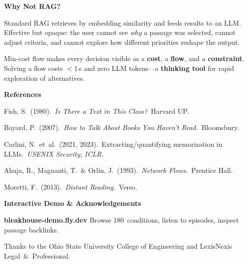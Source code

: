 \documentclass[landscape]{article}
\newcommand{\sectionheadsize}{\fontsize{30}{36}\selectfont}
\newcommand{\subsectionheadsize}{\fontsize{23}{28}\selectfont}
\newcommand{\bodysize}{\fontsize{20}{26}\selectfont}
\newcommand{\smallbody}{\fontsize{18}{23}\selectfont}
\newcommand{\postersection}[1]{%
  \vspace{2pt}%
  {\sffamily\bfseries\sectionheadsize\color{burgundy}#1}\par\nobreak
  \vspace{-4pt}{\color{gold}\rule{1.8in}{2.5pt}}\par
  \vspace{2pt}%
}
\newcommand{\postersubsection}[1]{%
  \vspace{4pt}%
  {\sffamily\bfseries\subsectionheadsize\color{burgundy}#1}\par
  \vspace{2pt}%
}
\begin{document}
\begin{minipage}[t]{0.295\textwidth}
\vspace{0.04in}

\begin{tcolorbox}[posterbox]
\postersection{Why Not RAG?}

\bodysize
Standard RAG retrieves by embedding similarity and feeds results to an
LLM\@.  Effective but opaque: the user cannot see \textit{why} a
passage was selected, cannot adjust criteria, and cannot explore
how different priorities reshape the output.

\vspace{4pt}
Min-cost flow makes every decision visible as a \textbf{cost},
a \textbf{flow}, and a \textbf{constraint}.  Solving a flow costs
$<$1\,s and zero LLM tokens---a \textbf{thinking tool} for
rapid exploration of alternatives.
\end{tcolorbox}

\vspace{0.04in}
\begin{tcolorbox}[posterbox]
\postersection{References}
\smallbody
Fish, S.\ (1980).\ \textit{Is There a Text in This Class?}\ Harvard UP.\par
Bayard, P.\ (2007).\ \textit{How to Talk About Books You Haven't Read.}\ Bloomsbury.\par
Carlini, N.\ et~al.\ (2021, 2023).\ Extracting/quantifying memorization in LLMs.\ \textit{USENIX Security; ICLR.}\par
Ahuja, R., Magnanti, T.\ \& Orlin, J.\ (1993).\ \textit{Network Flows.}\ Prentice Hall.\par
Moretti, F.\ (2013).\ \textit{Distant Reading.}\ Verso.
\end{tcolorbox}

\vspace{0.04in}
\begin{tcolorbox}[posterbox, colback=parchment]
\postersubsection{Interactive Demo \& Acknowledgements}
{\sffamily\bfseries\bodysize\color{teal}bleakhouse-demo.fly.dev}\quad
\smallbody Browse 180~conditions, listen to episodes, inspect passage backlinks.\par
\vspace{2pt}
\smallbody Thanks to the Ohio State University College of Engineering and
LexisNexis Legal~\&~Professional.
\end{tcolorbox}

\end{minipage}\hfill
%
\end{document}
